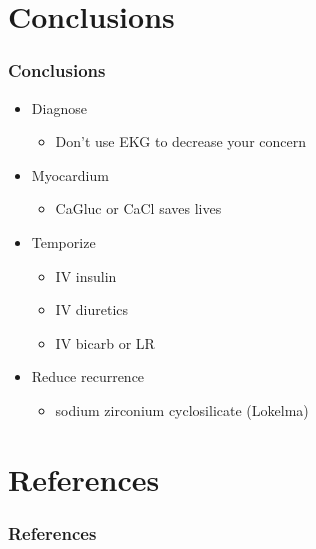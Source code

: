 \documentclass{beamer}
\begin{document}
\section{Conclusions}
\begin{frame}
	\frametitle{Conclusions}
	\begin{itemize}
		\item Diagnose
		\begin{itemize}
			\item Don't use EKG to decrease your concern
		\end{itemize}
		\item Myocardium
		\begin{itemize}
			\item CaGluc or CaCl saves lives
		\end{itemize}
		\item Temporize
		\begin{itemize}
			\item IV insulin
			\item IV diuretics
			\item IV bicarb or LR
		\end{itemize}
		\item Reduce recurrence
		\begin{itemize}
			\item sodium zirconium cyclosilicate (Lokelma)
		\end{itemize}
	\end{itemize}
\end{frame}
\section{References}
\begin{frame}
	\frametitle{References}
	\printbibliography
\end{frame}
\end{document}
